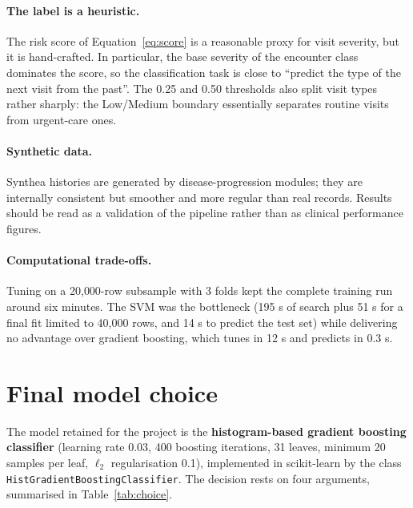 \documentclass[11pt,a4paper]{article}
\newcommand{\code}[1]{\texttt{\textcolor{codegrey}{#1}}}
\newcommand{\sect}[1]{\section{#1}}
\begin{document}
\paragraph{The label is a heuristic.}
The risk score of Equation~\eqref{eq:score} is a reasonable proxy for visit severity, but it is
hand-crafted. In particular, the base severity of the encounter class dominates the score, so the
classification task is close to ``predict the type of the next visit from the past''. The 0.25
and 0.50 thresholds also split visit types rather sharply: the Low/Medium boundary essentially
separates routine visits from urgent-care ones.

\paragraph{Synthetic data.}
Synthea histories are generated by disease-progression modules; they are internally consistent but
smoother and more regular than real records. Results should be read as a validation of the
pipeline rather than as clinical performance figures.

\paragraph{Computational trade-offs.}
Tuning on a 20{,}000-row subsample with 3 folds kept the complete training run around six
minutes. The SVM was the bottleneck (195 s of search plus 51 s for a final fit limited to
40{,}000 rows, and 14 s to predict the test set) while delivering no advantage over gradient
boosting, which tunes in 12 s and predicts in 0.3 s.

\sect{Final model choice}
\label{sec:choice}

The model retained for the project is the \textbf{histogram-based gradient boosting classifier}
(learning rate 0.03, 400 boosting iterations, 31 leaves, minimum 20 samples per leaf,
$\ell_2$ regularisation 0.1), implemented in scikit-learn by the class
\code{HistGradientBoostingClassifier}. The decision rests on four arguments, summarised in
Table~\ref{tab:choice}.
\end{document}
